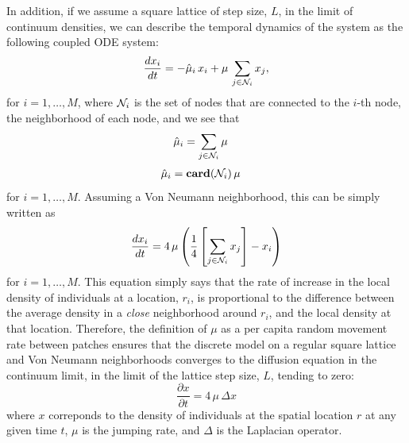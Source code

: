 In addition, if we assume a square lattice of step size, $L$, in the limit of continuum densities, we can describe the temporal dynamics of the system as the following coupled ODE system:
\begin{equation}
\frac{dx_i}{dt} = -\hat{\mu}_i\,x_i + \mu \, \sum_{j \in {\cal N}_i} x_j, 
\end{equation}
for $i=1, \dots, M$, where ${\cal N}_i$ is the set of nodes that are connected to the $i$-th node, the neighborhood of each node, and we see that 
\begin{align*}
\hat{\mu}_i   &= \sum_{j \in {\cal N}_i} \mu
\end{align*} 
\begin{align*}
\hat{\mu}_i   &= \mathbf{card}({\cal N}_i)\, \mu
\end{align*} 
for $i=1, \dots, M$. Assuming a Von Neumann neighborhood, this can be simply written as
\begin{equation}
\frac{dx_i}{dt} = 4\,\mu \left(\frac{1}{4} \left[\sum_{j \in {\cal N}_i} x_j\right] - x_i\right)
\end{equation}
for $i=1, \dots, M$. This equation simply says that the rate of increase in the local density of individuals at a location, $r_i$, is proportional to the difference between the average density in a \emph{close} neighborhood around $r_i$, and the local density at that location. Therefore, the definition of $\mu$ as a per capita random movement rate between patches ensures that the discrete model on a regular square lattice and Von Neumann neighborhoods converges to the diffusion equation in the continuum limit, in the limit of the lattice step size, $L$, tending to zero:
\begin{equation}
\frac{\partial x}{\partial t} = 4\, \mu \, \Delta x
\label{eq:Diffusion}
\end{equation}
where $x$ correponds to the density of individuals at the spatial location $r$ at any given time $t$, $\mu$ is the jumping rate, and $\Delta$ is the Laplacian operator.  
\smallskip

